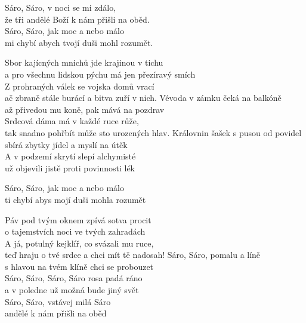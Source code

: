 \cho 
{}Sáro, Sáro, v noci se mi zdálo, \\
že tři andělé Boží k nám přišli na oběd.\\ 
Sáro, Sáro, jak moc a nebo málo \\
mi chybí abych tvojí duši mohl rozum{ě}t.

\ve
Sbor kajícných mnichů jde krajinou v tichu \\
a pro všechnu lidskou pýchu má jen přezíravý smích \\
Z prohraných válek se vojska domů vrací \\
ač zbraně stále burácí a bitva zuří v nich.
\cho
\ve
Vévoda v zámku čeká na balkóně \\
až přivedou mu koně, pak mává na pozdrav \\
Srdcová dáma má v každé ruce růže, \\
tak snadno pohřbít může sto urozených hlav.
\cho
\ve
Královnin šašek s pusou od povidel \\
sbírá zbytky jídel a myslí na útěk \\
A v podzemí skrytí slepí alchymisté \\
už objevili jistě proti povinnosti lék

\cho
Sáro, Sáro, jak moc a nebo málo \\
ti chybí abys mojí duši mohla rozumět 

\ve
Páv pod tvým oknem zpívá sotva procit \\
o tajemstvích noci ve tvých zahradách \\
A já, potulný kejklíř, co svázali mu ruce, \\
teď hraju o tvé srdce a chci mít tě nadosah!
\cho
Sáro, Sáro, pomalu a líně \\
s hlavou na tvém klíně chci se probouzet \\
Sáro, Sáro, Sáro, Sáro rosa padá ráno \\
a v poledne už možná bude jiný svět\\

Sáro, Sáro, vstávej milá Sáro \\
andělé k nám přišli na oběd

\esong